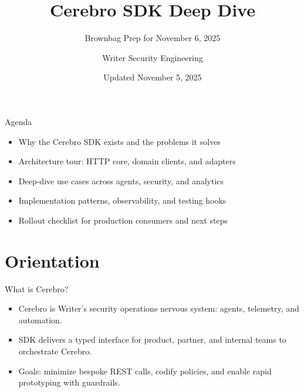 \documentclass[aspectratio=169]{beamer}
\title{Cerebro SDK Deep Dive}
\subtitle{Brownbag Prep for November 6, 2025}
\author{Writer Security Engineering}
\date{Updated November 5, 2025}
\begin{document}
\begin{frame}
  \titlepage
\end{frame}

\begin{frame}{Agenda}
  \begin{itemize}
    \item Why the Cerebro SDK exists and the problems it solves
    \item Architecture tour: HTTP core, domain clients, and adapters
    \item Deep-dive use cases across agents, security, and analytics
    \item Implementation patterns, observability, and testing hooks
    \item Rollout checklist for production consumers and next steps
  \end{itemize}
\end{frame}

\section{Orientation}

\begin{frame}{What is Cerebro?}
  \begin{itemize}
    \item Cerebro is Writer's security operations nervous system: agents, telemetry, and automation.
    \item SDK delivers a typed interface for product, partner, and internal teams to orchestrate Cerebro.
    \item Goals: minimize bespoke REST calls, codify policies, and enable rapid prototyping with guardrails.
  \end{itemize}
\end{frame}
\end{document}
